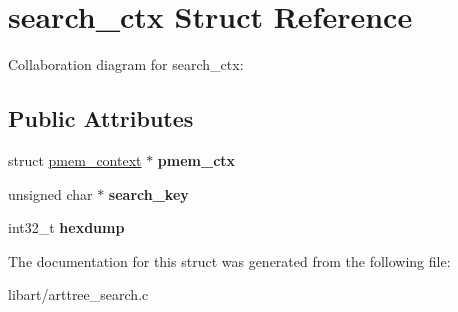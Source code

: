 \hypertarget{structsearch__ctx}{}\section{search\+\_\+ctx Struct Reference}
\label{structsearch__ctx}


Collaboration diagram for search\+\_\+ctx\+:
\subsection*{Public Attributes}
\begin{DoxyCompactItemize}
\item 
\mbox{\label{structsearch__ctx_a65b819217ecf6cd9c54318def63a7a02}} 
struct \hyperlink{structpmem__context}{pmem\+\_\+context} $\ast$ {\bfseries pmem\+\_\+ctx}
\item 
\mbox{\label{structsearch__ctx_ae6938bd27c973af6c72ce93f90b78d65}} 
unsigned char $\ast$ {\bfseries search\+\_\+key}
\item 
\mbox{\label{structsearch__ctx_a1f1c278139336ccf536c972fdf89be92}} 
int32\+\_\+t {\bfseries hexdump}
\end{DoxyCompactItemize}


The documentation for this struct was generated from the following file\+:\begin{DoxyCompactItemize}
\item 
libart/arttree\+\_\+search.\+c\end{DoxyCompactItemize}
